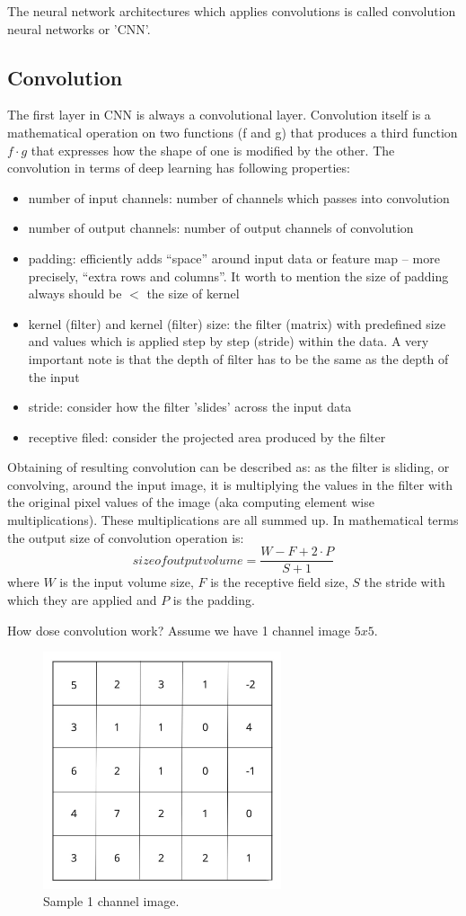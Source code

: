 The neural network architectures which applies convolutions is called convolution neural networks or 'CNN'.    

\subsection{Convolution}
The first layer in CNN is always a convolutional layer. Convolution itself is a mathematical operation on two functions (f and g) that produces a third function $f \cdot g$ that expresses how the shape of one is modified by the other. The convolution in terms of deep learning has following properties:  
\begin{itemize}
    \item number of input channels: number of channels which passes into convolution 
    \item number of output channels: number of output channels of convolution
    \item padding: efficiently adds “space” around input data or feature map – more precisely, “extra rows and columns”. It worth to mention the size of padding always should be $<$ the size of kernel 
    \item kernel (filter) and kernel (filter) size: the filter (matrix) with predefined size and values which is applied step by step (stride) within the data. A very important note is that the depth of filter has to be the same as the depth of the input
    \item stride: consider how the filter 'slides' across the input data
    \item receptive filed: consider the projected area produced by the filter
\end{itemize}

Obtaining of resulting convolution can be described as: as the filter is sliding, or convolving, around the input image, it is multiplying the values in the filter with the original pixel values of the image (aka computing element wise multiplications). These multiplications are all summed up. In mathematical terms the output size of convolution operation is: \[size of output volume = \frac{W-F+2 \cdot P}{S+1} \] where $W$ is the input volume size, $F$ is the receptive field size, $S$ the stride with which they are applied and $P$ is the padding.

How dose convolution work? Assume we have 1 channel image $5x5$.
\begin{figure}[h]
    \centering \includegraphics[width=7cm]{images/1_channel.jpg}
    \caption {Sample 1 channel image.}
\end{figure}

